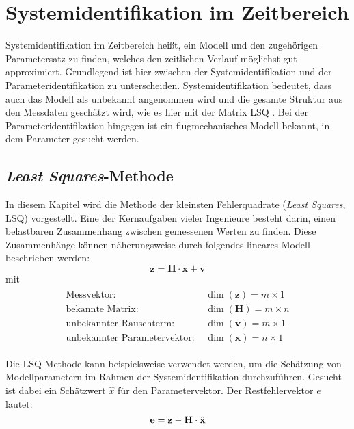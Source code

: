 \chapter{Systemidentifikation im Zeitbereich}
Systemidentifikation im Zeitbereich heißt, ein Modell und den zugehörigen Parametersatz zu finden, welches den zeitlichen Verlauf möglichst gut approximiert. Grundlegend ist hier zwischen der Systemidentifikation und der Parameteridentifikation zu unterscheiden. Systemidentifikation bedeutet, dass auch das Modell als unbekannt angenommen wird und die gesamte Struktur aus den Messdaten geschätzt wird, wie es hier mit der Matrix LSQ . Bei der Parameteridentifikation hingegen ist ein flugmechanisches Modell bekannt, in dem Parameter gesucht werden.

\section{\textit{Least Squares}-Methode}
In diesem Kapitel wird die Methode der kleinsten Fehlerquadrate (\textit{Least Squares}, LSQ) vorgestellt.
Eine der Kernaufgaben vieler Ingenieure besteht darin, einen belastbaren Zusammenhang zwischen gemessenen Werten zu finden. 
Diese Zusammenhänge können näherungsweise durch folgendes lineares Modell beschrieben werden:  
\begin{equation}
    \mathbf{z} = \mathbf{H}\cdot \mathbf{x}+\mathbf{v}
\end{equation}
mit 
\begin{align}
	\begin{split}
		\text{Messvektor: } &\dim{(\mathbf{z})} = m\times 1\\
		\text{bekannte Matrix: } &\dim{(\mathbf{H})} = m\times n\\
		\text{unbekannter Rauschterm: } &\dim{(\mathbf{v})} = m\times1\\
		\text{unbekannter Parametervektor: } &\dim{(\mathbf{x})} = n\times 1
		\nonumber
	\end{split}
\end{align}

Die LSQ-Methode kann beispielsweise verwendet werden, um die Schätzung von Modellparametern im Rahmen der 
Systemidentifikation durchzuführen. Gesucht ist dabei ein Schätzwert $\hat{x}$ für den Parametervektor. Der Restfehlervektor 
$e$ lautet:
\begin{equation}
    \mathbf{e} = \mathbf{z} - \mathbf{H}\cdot \hat{\mathbf{x}} \\
\end{equation}


